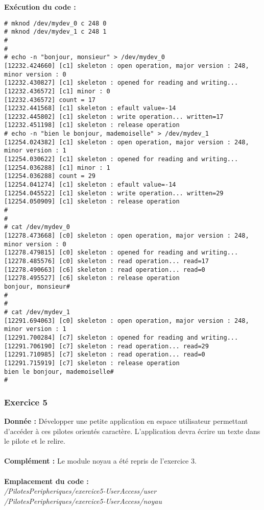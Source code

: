 \textbf{Exécution du code : } \\
\begin{lstlisting}
# mknod /dev/mydev_0 c 248 0
# mknod /dev/mydev_1 c 248 1
# 
# 
# echo -n "bonjour, monsieur" > /dev/mydev_0
[12232.424660] [c1] skeleton : open operation, major version : 248, minor version : 0
[12232.430827] [c1] skeleton : opened for reading and writing...
[12232.436572] [c1] minor : 0
[12232.436572] count = 17
[12232.441568] [c1] skeleton : efault value=-14
[12232.445802] [c1] skeleton : write operation... written=17
[12232.451198] [c1] skeleton : release operation
# echo -n "bien le bonjour, mademoiselle" > /dev/mydev_1
[12254.024382] [c1] skeleton : open operation, major version : 248, minor version : 1
[12254.030622] [c1] skeleton : opened for reading and writing...
[12254.036288] [c1] minor : 1
[12254.036288] count = 29
[12254.041274] [c1] skeleton : efault value=-14
[12254.045522] [c1] skeleton : write operation... written=29
[12254.050909] [c1] skeleton : release operation
# 
# 
# cat /dev/mydev_0
[12278.473668] [c0] skeleton : open operation, major version : 248, minor version : 0
[12278.479815] [c0] skeleton : opened for reading and writing...
[12278.485576] [c0] skeleton : read operation... read=17
[12278.490663] [c6] skeleton : read operation... read=0
[12278.495527] [c6] skeleton : release operation
bonjour, monsieur# 
# 
# 
# cat /dev/mydev_1
[12291.694063] [c0] skeleton : open operation, major version : 248, minor version : 1
[12291.700284] [c7] skeleton : opened for reading and writing...
[12291.706190] [c7] skeleton : read operation... read=29
[12291.710985] [c7] skeleton : read operation... read=0
[12291.715919] [c7] skeleton : release operation
bien le bonjour, mademoiselle# 
# 
\end{lstlisting}

\subsubsection{Exercice 5}
\textbf{Donnée : } Développer	une	petite	application	en	espace	utilisateur	permettant	d’accéder	à	ces	pilotes	
orientés	caractère.	L’application	devra	écrire	un	texte	dans	le	pilote	et	le	relire.\\\\
\textbf{Complément : } Le module noyau a été repris de l'exercice 3.\\\\
\textbf{Emplacement du code : }\\ \textit{/PilotesPeripheriques/exercice5-UserAccess/user}\\
\textit{/PilotesPeripheriques/exercice5-UserAccess/noyau}\\

